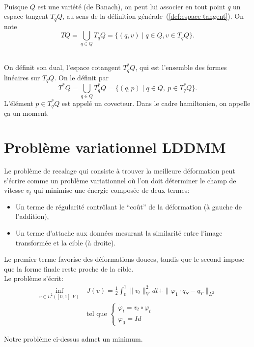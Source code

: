 \documentclass[12pt]{report}
\begin{document}
\begin{definition}\leavevmode\\
Puisque $Q$ est une variété (de Banach), on peut lui associer en tout point $q$ un espace tangent $T_{q}Q$, au sens de la définition générale~(\ref{def:espace-tangent}). On note
\[
TQ=\bigcup_{q\in Q} T_{q}Q=\{(q,v)\mid q\in Q, v\in T_{q}Q\}.
\]
\end{definition}

\begin{definition}\leavevmode\\
On définit son dual, l'espace cotangent $T_q^*Q$, qui est l'ensemble des formes linéaires sur $T_{q}Q$. On le définit par
\[
T^*Q=\bigcup_{q\in Q} T_q^*Q=\{(q,p)\mid q\in Q,\ p\in T_q^*Q\}.
\]
L'élément $p\in T_q^*Q$ est appelé un covecteur. Dans le cadre hamiltonien, on appelle ça un moment.
\end{definition}


\section{Problème variationnel LDDMM}
Le problème de recalage qui consiste à trouver la meilleure déformation peut s'écrire comme un problème variationnel où l'on doit déterminer le champ de vitesse $v_t$ qui minimise une énergie composée de deux termes:

\begin{itemize}
\item Un terme de régularité contrôlant le ``coût'' de la déformation (à gauche de l'addition),
\item Un terme d'attache aux données mesurant la similarité entre l'image transformée et la cible (à droite).
\end{itemize}
Le premier terme favorise des déformations douces, tandis que le second impose que la forme finale reste proche de la cible.\\
Le problème s'écrit:
\[
\begin{aligned}
\inf_{v\in L^2([0,1],V)}~&J(v)=\frac{1}{2}\int_{0}^{1}\|v_t\|_{V}^2\,dt+\|\varphi_1\cdot q_S-q_T\|_{L^2}\\
&\text{tel que }\left\{\begin{array}{ll}\dot{\varphi}_t=v_t\circ\varphi_t\\\varphi_0=Id\end{array}\right.
\end{aligned}
\]

\begin{theorem}\label{thm:min}
Notre problème ci-dessus admet un minimum.
\end{theorem}
\end{document}
